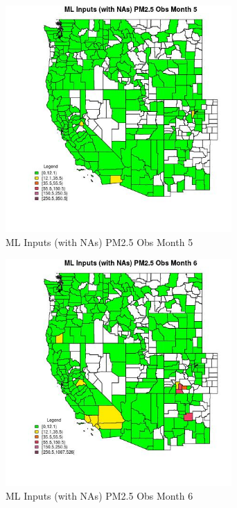 \begin{figure} 
\centering  
\includegraphics[width=0.77\textwidth]{Code_Outputs/Report_ML_input_PM25_Step4_part_e_de_duplicated_aves_compiled_2019-05-20wNAs_CountyPM25_ObsmedianMonth5.jpg} 
\caption{\label{fig:Report_ML_input_PM25_Step4_part_e_de_duplicated_aves_compiled_2019-05-20wNAsCountyPM25_ObsmedianMonth5}ML Inputs (with NAs) PM2.5 Obs Month 5} 
\end{figure} 
 

\begin{figure} 
\centering  
\includegraphics[width=0.77\textwidth]{Code_Outputs/Report_ML_input_PM25_Step4_part_e_de_duplicated_aves_compiled_2019-05-20wNAs_CountyPM25_ObsmedianMonth6.jpg} 
\caption{\label{fig:Report_ML_input_PM25_Step4_part_e_de_duplicated_aves_compiled_2019-05-20wNAsCountyPM25_ObsmedianMonth6}ML Inputs (with NAs) PM2.5 Obs Month 6} 
\end{figure} 
 

